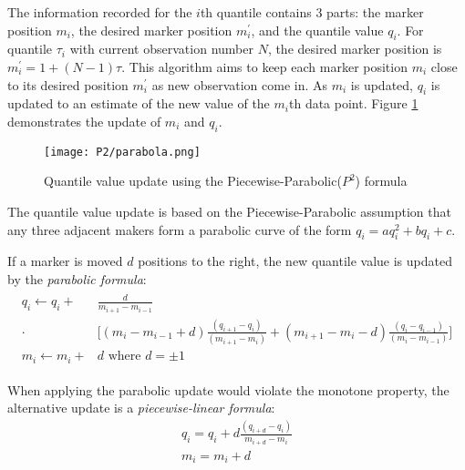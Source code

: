 The information recorded for the $i$th quantile contains 3 parts: the marker position $m_i$, the desired marker position $m_i^\prime$, and the quantile value $q_i$. For quantile $\tau_i$ with current observation number $N$, the desired marker position is $m_i^\prime = 1 + (N-1)\tau$. This algorithm aims to keep each marker position $m_i$ close to its desired position $m_i^\prime$ as new observation come in. As $m_i$ is updated, $q_i$ is updated to an estimate of the new value of the $m_i$th data point.
Figure \ref{fig: {multi_parabolic_p2}} demonstrates the update of $m_i$ and $q_i$.

\begin{figure}[h]
    \centering
	\texttt{[image: P2/parabola.png]}
    \caption{Quantile value update using the Piecewise-Parabolic($P^2$) formula}
    \label{fig: {multi_parabolic_p2}}
\end{figure}

The quantile value update is based on the Piecewise-Parabolic assumption that any three adjacent makers form a parabolic curve of the form $q_i = aq_i^2 + bq_i + c$.

If a marker is moved $d$ positions to the right, the new quantile value is updated by the \textit{parabolic formula}:
\begin{align}
\begin{split}
    q_{i} \leftarrow q_{i}+ & \frac{d}{m_{i+1}-m_{i-1}}\\
    \cdot & { \bigg[ 
        \left(m_{i}-m_{i-1}+d\right) \frac{\left(q_{i+1}-q_{i}\right)}{\left(m_{i+1}-m_{i}\right)}
        +\left(m_{i+1}-m_{i}-d\right) \frac{\left(q_{i}-q_{i-1}\right)}{\left(m_{i}-m_{i-1}\right)}
        } \bigg] \\
    m_{i} \leftarrow m_{i}+&d \text{ where } d = \pm 1
\end{split}
\end{align}

When applying the parabolic update would violate the monotone property, the alternative update is a \textit{piecewise-linear formula}:
\begin{equation}
    \begin{array}{l}
    q_{i}=q_{i}+d \frac{\left(q_{i+d}-q_{i}\right)}{m_{i+d}-m_{i}} \\
    m_{i}=m_{i}+d
    \end{array}
\end{equation}

